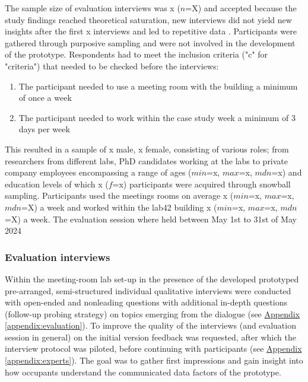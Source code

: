 The sample size of evaluation interviews was x ($n$=X) and accepted because the study findings reached theoretical saturation, new interviews did not yield new insights after the first x interviews and led to repetitive data \cite{steph_menken_introduction_2016}. Participants were gathered through purposive sampling and were not involved in the development of the prototype. Respondents had to meet the inclusion criteria ("c" for "criteria") that needed to be checked before the interviews: 

\begin{enumerate}
    \renewcommand{\labelenumi}{C\arabic{enumi}:}
    \item The participant needed to use a meeting room with the building a minimum of once a week
    \item The participant needed to work within the case study week a minimum of 3 days per week
\end{enumerate}

This resulted in a sample of x male, x female, consisting of various roles; from researchers from different labs, PhD candidates working at the labs to private company employees encompassing a range of ages ($min$=x, $max$=x, $mdn$=x) and education levels of which x ($f$=x) participants were acquired through snowball sampling. Participants used the meetings rooms on average x ($min$=x, $max$=x, $mdn$=X) a week and worked within the lab42 building x ($min$=x, $max$=x, $mdn$=X) a week. The evaluation session where held between May 1st to 31st of May 2024

\subsubsection{Evaluation interviews}

Within the meeting-room lab set-up in the presence of the developed prototyped pre-arranged, semi-structured individual qualitative interviews were conducted with open-ended and nonleading questions with additional in-depth questions (follow-up probing strategy) on topics emerging from the dialogue (see \hyperref[appendix:evaluation]{Appendix \ref*{appendix:evaluation}}). To improve the quality of the interviews (and evaluation session in general) on the initial version feedback was requested, after which the interview protocol was piloted, before continuing with participants (see \hyperref[appendix:experts]{Appendix \ref*{appendix:experts}}). The goal was to gather first impressions and gain insight into how occupants understand the communicated data factors of the prototype.

